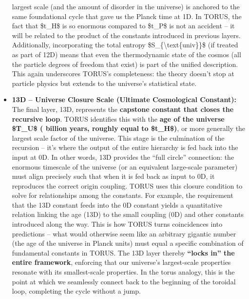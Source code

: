 \documentclass[
]{article}
\begin{document}
\begin{itemize}
  largest scale (and the amount of disorder in the universe) is anchored
  to the same foundational cycle that gave us the Planck time at 1D. In
  TORUS, the fact that \$t\_H\$ is so enormous compared to \$t\_P\$ is
  not an accident -- it will be related to the product of the constants
  introduced in previous layers. Additionally, incorporating the total
  entropy \$S\_\{\textbackslash text\{univ\}\}\$ (if treated as part of
  12D) means that even the thermodynamic state of the cosmos (all the
  particle degrees of freedom that exist) is part of the unified
  description. This again underscores TORUS's completeness: the theory
  doesn't stop at particle physics but extends to the universe's
  statistical state.
\item
  \textbf{13D -- Universe Closure Scale (Ultimate Cosmological
  Constant):} The final layer, 13D, represents the \textbf{capstone
  constant that closes the recursive loop}. TORUS identifies this with
  the \textbf{age of the universe \$T\_U\$ ( billion years, roughly
  equal to \$t\_H\$)}\hspace{0pt}, or more generally the largest scale
  factor of the universe. This stage is the culmination of the recursion
  -- it's where the output of the entire hierarchy is fed back into the
  input at 0D. In other words, 13D provides the ``full circle''
  connection: the enormous timescale of the universe (or an equivalent
  large-scale parameter) must align precisely such that when it is fed
  back as input to 0D, it reproduces the correct origin coupling. TORUS
  uses this closure condition to solve for relationships among the
  constants. For example, the requirement that the 13D constant feeds
  into the 0D constant yields a quantitative relation linking the age
  (13D) to the small coupling (0D) and other constants introduced along
  the way\hspace{0pt}. This is how TORUS turns coincidences into
  predictions -- what would otherwise seem like an arbitrary gigantic
  number (the age of the universe in Planck units) must equal a specific
  combination of fundamental constants in TORUS. The 13D layer thereby
  \textbf{``locks in'' the entire framework}, enforcing that our
  universe's largest-scale properties resonate with its smallest-scale
  properties. In the torus analogy, this is the point at which we
  seamlessly connect back to the beginning of the toroidal loop,
  completing the cycle without a jump.
\end{itemize}
\end{document}
